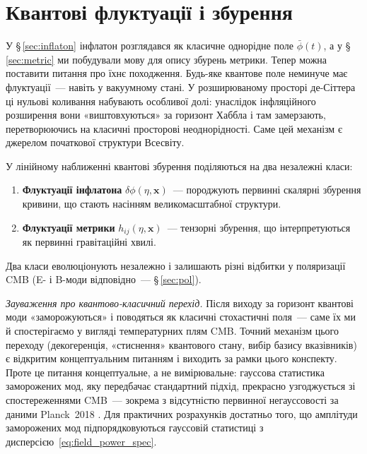 \documentclass[12pt, a4paper]{article}
\begin{document}
\section{Квантові флуктуації і збурення}
\label{sec:quantum}

У §\,\ref{sec:inflaton} інфлатон розглядався як класичне однорідне
поле $\bar{\phi}(t)$, а у §\,\ref{sec:metric} ми побудували мову
для опису збурень метрики. Тепер можна поставити питання про
їхнє походження. Будь-яке квантове поле неминуче має
флуктуації~--- навіть у вакуумному стані. У розширюваному просторі
де-Сіттера ці нульові коливання набувають особливої долі: унаслідок
інфляційного розширення вони «виштовхуються» за горизонт Хаббла і
там замерзають, перетворюючись на класичні просторові неоднорідності.
Саме цей механізм є джерелом початкової структури Всесвіту.

У лінійному наближенні квантові збурення поділяються на два
незалежні класи:
\begin{enumerate}
  \item \textbf{Флуктуації інфлатона} $\delta\phi(\eta, \mathbf{x})$~---
        породжують первинні скалярні збурення кривини, що стають
        насінням великомасштабної структури.
  \item \textbf{Флуктуації метрики} $h_{ij}(\eta, \mathbf{x})$~---
        тензорні збурення, що інтерпретуються як первинні
        гравітаційні хвилі.
\end{enumerate}
Два класи еволюціонують незалежно і залишають різні відбитки
у поляризації CMB (E- і B-моди відповідно~--- §\,\ref{sec:pol}).

\textit{Зауваження про квантово-класичний перехід.}
Після виходу за горизонт квантові моди «заморожуються» і
поводяться як класичні стохастичні поля~--- саме їх ми й
спостерігаємо у вигляді температурних плям CMB. Точний механізм
цього переходу (декогеренція, «стиснення» квантового стану,
вибір базису вказівників) є відкритим концептуальним питанням
і виходить за рамки цього конспекту. Проте це питання
концептуальне, а не вимірювальне: гауссова статистика заморожених
мод, яку передбачає стандартний підхід, прекрасно узгоджується зі
спостереженнями CMB~--- зокрема з відсутністю первинної
негауссовості за даними Planck~2018 \cite{planck_2018}.
Для практичних розрахунків достатньо того, що амплітуди
заморожених мод підпорядковуються гауссовій статистиці з
дисперсією~\eqref{eq:field_power_spec}.
\end{document}
